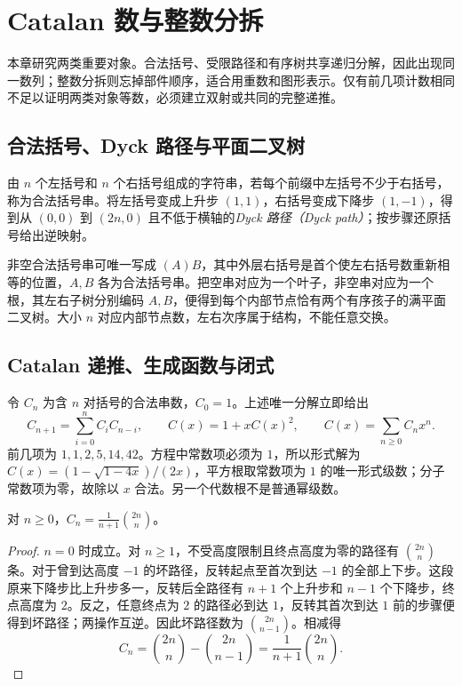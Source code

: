 \setcounter{chapter}{8} %
\chapter{Catalan 数与整数分拆}
\label{ch:classical-structures}

本章研究两类重要对象。合法括号、受限路径和有序树共享递归分解，因此出现同一数列；整数分拆则忘掉部件顺序，适合用重数和图形表示。仅有前几项计数相同不足以证明两类对象等数，必须建立双射或共同的完整递推。

\section{合法括号、Dyck 路径与平面二叉树}

由 $n$ 个左括号和 $n$ 个右括号组成的字符串，若每个前缀中左括号不少于右括号，称为合法括号串。将左括号变成上升步 $(1,1)$，右括号变成下降步 $(1,-1)$，得到从 $(0,0)$ 到 $(2n,0)$ 且不低于横轴的\emph{Dyck 路径（Dyck path）}；按步骤还原括号给出逆映射。

非空合法括号串可唯一写成 $(A)B$，其中外层右括号是首个使左右括号数重新相等的位置，$A,B$ 各为合法括号串。把空串对应为一个叶子，非空串对应为一个根，其左右子树分别编码 $A,B$，便得到每个内部节点恰有两个有序孩子的满平面二叉树。大小 $n$ 对应内部节点数，左右次序属于结构，不能任意交换。

\section{Catalan 递推、生成函数与闭式}

令 $C_n$ 为含 $n$ 对括号的合法串数，$C_0=1$。上述唯一分解立即给出
\begin{equation}
 C_{n+1}=\sum_{i=0}^nC_iC_{n-i},\qquad
 C(x)=1+xC(x)^2,\qquad C(x)=\sum_{n\ge0}C_nx^n.
 \label{eq:catalan}
\end{equation}
前几项为 $1,1,2,5,14,42$。方程中常数项必须为 $1$，所以形式解为 $C(x)=(1-\sqrt{1-4x})/(2x)$，平方根取常数项为 $1$ 的唯一形式级数；分子常数项为零，故除以 $x$ 合法。另一个代数根不是普通幂级数。

\begin{theorem}[Catalan 公式]
对 $n\ge0$，$C_n=\frac1{n+1}\binom{2n}{n}$。
\end{theorem}
\begin{proof}
$n=0$ 时成立。对 $n\ge1$，不受高度限制且终点高度为零的路径有 $\binom{2n}{n}$ 条。对于曾到达高度 $-1$ 的坏路径，反转起点至首次到达 $-1$ 的全部上下步。这段原来下降步比上升步多一，反转后全路径有 $n+1$ 个上升步和 $n-1$ 个下降步，终点高度为 $2$。反之，任意终点为 $2$ 的路径必到达 $1$，反转其首次到达 $1$ 前的步骤便得到坏路径；两操作互逆。因此坏路径数为 $\binom{2n}{n-1}$。相减得
\[
 C_n=\binom{2n}{n}-\binom{2n}{n-1}
 =\frac1{n+1}\binom{2n}{n}.
\]
\end{proof}


